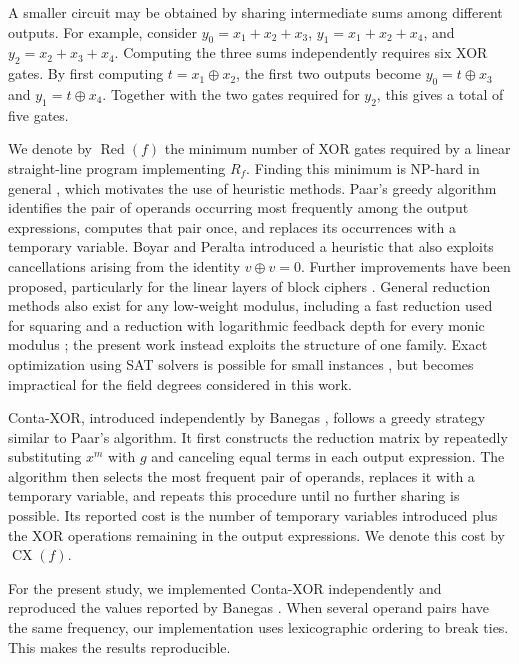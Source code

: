 \documentclass{ieeeaccess}
\theoremstyle{plain}
\theoremstyle{definition}
\newcommand{\Red}{\operatorname{Red}}
\newcommand{\CX}{\operatorname{CX}}
\newcommand{\xor}{\oplus}
\begin{document}
A smaller circuit may be obtained by sharing intermediate sums among different
outputs. For example, consider $y_0=x_1+x_2+x_3$, $y_1=x_1+x_2+x_4$, and
$y_2=x_2+x_3+x_4$. Computing the three sums independently requires six XOR
gates. By first computing $t=x_1\xor x_2$, the first two outputs become
$y_0=t\xor x_3$ and $y_1=t\xor x_4$. Together with the two gates required for
$y_2$, this gives a total of five gates.

We denote by $\Red(f)$ the minimum number of XOR gates required by a linear
straight-line program implementing $R_f$. Finding this minimum is NP-hard in
general \cite{BMP2013}, which motivates the use of heuristic methods. Paar's
greedy algorithm \cite{Paar1997} identifies the pair of operands occurring most
frequently among the output expressions, computes that pair once, and replaces
its occurrences with a temporary variable. Boyar and Peralta
\cite{BoyarPeralta2010} introduced a heuristic that also exploits cancellations
arising from the identity $v\xor v=0$. Further improvements have been proposed,
particularly for the linear layers of block ciphers
\cite{Kranz2017,Banik2019,TanPeyrin2020, Xiang2020,SunYangLi2025}.
General reduction methods also exist for any low-weight modulus, including a
fast reduction used for squaring \cite{NiehuesCP2018} and a reduction with
logarithmic feedback depth for every monic modulus \cite{ZhouZhang2026}; the
present work instead exploits the structure of one family. Exact
optimization using SAT solvers is possible for small instances
\cite{FuhsSK2010,Stoffelen2016}, but becomes impractical for the field degrees
considered in this work.

Conta-XOR, introduced independently by Banegas \cite[Ch.~4]{Banegas2015},
follows a greedy strategy similar to Paar's algorithm. It first constructs the
reduction matrix by repeatedly substituting $x^m$ with $g$ and canceling equal
terms in each output expression. The algorithm then selects the most frequent
pair of operands, replaces it with a temporary variable, and repeats this
procedure until no further sharing is possible. Its reported cost is the number
of temporary variables introduced plus the XOR operations remaining in the
output expressions. We denote this cost by $\CX(f)$.

For the present study, we implemented Conta-XOR independently and reproduced the
values reported by Banegas \cite{Banegas2015}. When several operand pairs have
the same frequency, our implementation uses lexicographic ordering to break
ties. This makes the results reproducible.
\end{document}
